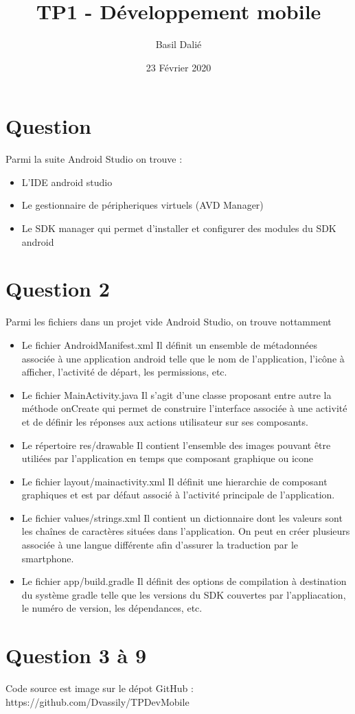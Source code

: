\documentclass{article}
\title{TP1 - Développement mobile}
\author{Basil Dalié}
\date{23 Février 2020}
\begin{document}
\maketitle

\section{Question}
Parmi la suite Android Studio on trouve :
\begin{itemize}
\item L'IDE android studio
\item Le gestionnaire de péripheriques virtuels (AVD Manager)
\item Le SDK manager qui permet d'installer et configurer des modules du SDK android
\end{itemize}

\section{Question 2}
Parmi les fichiers dans un projet vide Android Studio, on trouve nottamment
\begin{itemize}
\item Le fichier AndroidManifest.xml
  Il définit un ensemble de métadonnées associée à une application android telle que le nom de l'application, l'icône à afficher, l'activité de départ, les permissions, etc.
\item Le fichier MainActivity.java
  Il s'agit d'une classe proposant entre autre la méthode onCreate qui permet de construire l'interface associée à une activité et de définir les réponses aux actions utilisateur sur ses composants.
\item Le répertoire res/drawable
  Il contient l'ensemble des images pouvant être utiliées par l'application en temps que composant graphique ou icone
\item Le fichier layout/main\textunderscore activity.xml
  Il définit une hierarchie de composant graphiques et est par défaut associé à l'activité principale de l'application.
\item Le fichier values/strings.xml
  Il contient un dictionnaire dont les valeurs sont les chaînes de caractères situées dans l'application. On peut en créer plusieurs associée à une langue différente afin d'assurer la traduction par le smartphone.
\item Le fichier app/build.gradle
  Il définit des options de compilation à destination du système gradle telle que les versions du SDK couvertes par l'appliacation, le numéro de version, les dépendances, etc.
\end{itemize}

\section{Question 3 à 9}
Code source est image sur le dépot GitHub :
https://github.com/Dvassily/TPDevMobile
\end{document}
